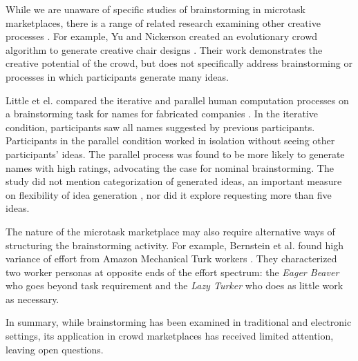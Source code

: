 While we are unaware of specific studies of brainstorming in microtask marketplaces, there is a range of related research examining other creative processes \cite{lewis2011affective, kittur2011crowdforge, Zhang:2012:HCT:2207676.2207708}. For example, Yu and Nickerson created an evolutionary crowd algorithm to generate creative chair designs \cite{yu_cooks_2011}. Their work demonstrates the creative potential of the crowd, but does not specifically address brainstorming or processes in which participants generate many ideas. 

Little et el. compared the iterative and parallel human computation processes on a brainstorming task for names for fabricated companies \cite{little2010exploring}. In the iterative condition, participants saw all names suggested by previous participants. Participants in the parallel condition worked in isolation without seeing other participants' ideas. The parallel process was found to be more likely to generate names with high ratings, advocating the case for nominal brainstorming. The study did not mention categorization of generated ideas, an important measure on flexibility of idea generation \cite{lewis2011affective, nijstad_how_2006, finke1992creative, shah2003metrics}, nor did it explore requesting more than five ideas.

The nature of the microtask marketplace may also require alternative ways of structuring the brainstorming activity.
For example, Bernstein et al. found high variance of effort from Amazon Mechanical Turk workers \cite{soylent}. They characterized two worker personas at opposite ends of the effort spectrum: the {\em Eager Beaver\/} who goes beyond task requirement and the {\em Lazy Turker\/} who does as little work as necessary. 




In summary, while brainstorming has been examined in traditional and electronic settings, its application in crowd marketplaces has received limited attention, leaving open questions.
